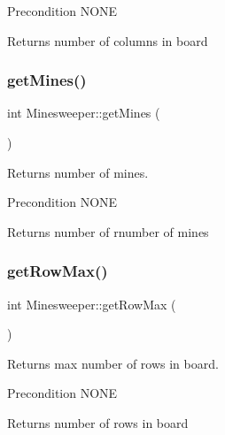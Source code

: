 \begin{DoxyPrecond}{Precondition}
N\+O\+NE 
\end{DoxyPrecond}
\begin{DoxyReturn}{Returns}
number of columns in board 
\end{DoxyReturn}
\mbox{\label{class_minesweeper_a3ea6ef07c7a730c815ff62d213ca72af}} 
\subsubsection{\texorpdfstring{get\+Mines()}{getMines()}}
{\footnotesize\ttfamily int Minesweeper\+::get\+Mines (\begin{DoxyParamCaption}{ }\end{DoxyParamCaption})}



Returns number of mines. 

\begin{DoxyPrecond}{Precondition}
N\+O\+NE 
\end{DoxyPrecond}
\begin{DoxyReturn}{Returns}
number of rnumber of mines 
\end{DoxyReturn}
\mbox{\label{class_minesweeper_aad4e9c313183fa9eeb90cef65f325026}} 
\subsubsection{\texorpdfstring{get\+Row\+Max()}{getRowMax()}}
{\footnotesize\ttfamily int Minesweeper\+::get\+Row\+Max (\begin{DoxyParamCaption}{ }\end{DoxyParamCaption})}



Returns max number of rows in board. 

\begin{DoxyPrecond}{Precondition}
N\+O\+NE 
\end{DoxyPrecond}
\begin{DoxyReturn}{Returns}
number of rows in board 
\end{DoxyReturn}
\mbox{\label{class_minesweeper_a563e151311a5b9965f523a5faaf13124}} 
